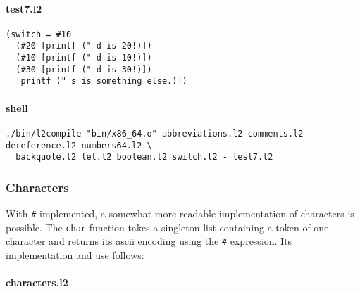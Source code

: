 \documentclass[]{article}
\let\oldparagraph\paragraph
\renewcommand{\paragraph}[1]{\oldparagraph{#1}\mbox{}}
\begin{document}
\paragraph{test7.l2}\label{test7.l2}

\begin{verbatim}
(switch = #10
  (#20 [printf (" d is 20!)])
  (#10 [printf (" d is 10!)])
  (#30 [printf (" d is 30!)])
  [printf (" s is something else.)])
\end{verbatim}

\paragraph{shell}\label{shell-6}

\begin{verbatim}
./bin/l2compile "bin/x86_64.o" abbreviations.l2 comments.l2 dereference.l2 numbers64.l2 \
  backquote.l2 let.l2 boolean.l2 switch.l2 - test7.l2
\end{verbatim}

\hypertarget{characters}{\subsubsection{Characters}\label{characters}}

With \texttt{\#} implemented, a somewhat more readable implementation of
characters is possible. The \texttt{char} function takes a singleton
list containing a token of one character and returns its ascii encoding
using the \texttt{\#} expression. Its implementation and use follows:

\paragraph{characters.l2}\label{characters.l2}
\end{document}
